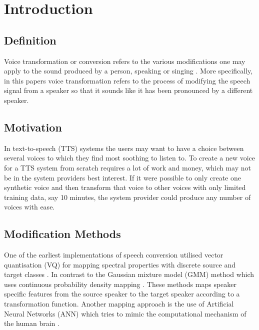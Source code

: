 \chapter{Introduction} %
\label{cha:introduction}
  

\section{Definition} %
\label{sec:definition}
Voice transformation or conversion refers to the various modifications one may apply to the sound produced by a person, speaking or singing \cite{stylianou08}. More specifically, in this papers voice transformation refers to the process of modifying the speech signal from a speaker so that it sounds like it has been pronounced by a different speaker. 

\section{Motivation} %
\label{sec:motivation}
In text-to-speech (TTS) systems the users may want to have a choice between several voices to which they find most soothing to listen to. To create a new voice for a TTS system from scratch requires a lot of work and money, which may not be in the system providers best interest. If it were possible to only create one synthetic voice and then transform that voice to other voices with only limited training data, say 10 minutes, the system provider could produce any number of voices with ease. 

\section{Modification Methods} %
\label{sec:synthesis_methods}
One of the earliest implementations of speech conversion utilised vector quantisation (VQ) for mapping spectral properties with discrete source and target classes \cite{abe88}. In contrast to the Gaussian mixture model (GMM) method which uses continuous probability density mapping \cite{stylianou98}. These methods maps speaker specific features from the source speaker to the target speaker according to a transformation function. Another mapping approach is the use of Artificial Neural Networks (ANN) \cite{desai09} which tries to mimic the computational mechanism of the human brain \cite{young75}. 


